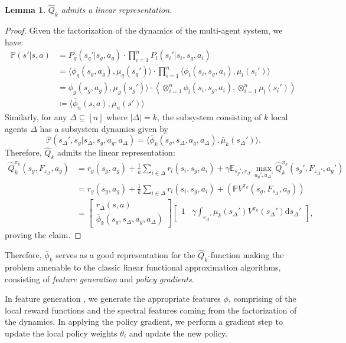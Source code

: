 \documentclass{article}
\theoremstyle{plain}
\newtheorem{lemma}[theorem]{Lemma}
\theoremstyle{definition}
\def\E{\mathbb{E}}
\begin{document}
\begin{lemma}
    \emph{$\hat{Q}_k$ admits a linear representation.}
\end{lemma}
\begin{proof}
Given the factorization of the dynamics of the multi-agent system, we have:
\begin{align*}\mathbb{P}(s'|s,a) &= P_g(s_g'|s_g,a_g)\cdot \prod_{i=1}^n P_l(s_i'|s_i,s_g,a_i) \\
&= \langle \phi_g(s_g,a_g), \mu_g(s_g')\rangle\cdot \prod_{i=1}^n \langle \phi_l(s_i,s_g,a_i), \mu_l(s_i')\rangle \\
&= \phi_g(s_g,a_g), \mu_g(s_g')\rangle\cdot \left\langle \otimes_{i=1}^n \phi_l(s_i,s_g,a_i), \otimes_{i=1}^n \mu_l(s_i')\right\rangle \\
&\coloneq \langle \bar{\phi}_n(s,a),\bar{\mu}_n(s')\rangle
\end{align*}
Similarly, for any $\Delta\subseteq [n]$ where $|\Delta|=k$, the subsystem consisting of $k$ local agents $\Delta$ has a subsystem dynamics given by \[\mathbb{P}(s_\Delta',s_g|s_\Delta,s_g,a_g,a_\Delta) = \langle \bar{\phi}_k(s_g,s_\Delta,a_g,a_\Delta),\bar{\mu}_k(s_\Delta')\rangle.\]
Therefore, $\hat{Q}_k$ admits the linear representation:
\begin{align*}\hat{Q}_k^{\pi_k}(s_g,F_{z_\Delta},a_g) &= r_g(s_g,a_g) + \frac{1}{k}\sum_{i\in\Delta}r_l(s_i,s_g,a_i) + \gamma\E_{s_g',s_{\Delta'}}\max_{a_g',a_{\Delta}'}\hat{Q}_k^{\pi_k}(s_g',F_{z_\Delta'},a_g')\\
&= r_g(s_g,a_g) + \frac{1}{k}\sum_{i\in\Delta}r_l(s_i,s_g,a_i) + (\mathbb{P} V^{\pi_k}(s_g,F_{s_\Delta},a_g))\\
&= \begin{bmatrix}r_\Delta(s,a)\\ \bar{\phi}_k(s_g,s_\Delta,a_g,a_\Delta)\end{bmatrix}\begin{bmatrix}1&\gamma\int_{s_\Delta'}\mu_k(s_\Delta')V^{\pi_k}(s_\Delta')\mathrm ds_{\Delta}'\end{bmatrix},
\end{align*}
proving the claim.
\end{proof}


Therefore, $\bar{\phi}_k$ serves as a good representation for the $\hat{Q}_k$-function making the problem amenable to the classic linear functional approximation algorithms, consisting of \emph{feature generation} and \emph{policy gradients}.

In feature generation \citep{ren2024scalablespectralrepresentationsnetwork}, we generate the appropriate features $\phi$, comprising of the local reward functions and the spectral features coming from the factorization of the dynamics. In applying the policy gradient, we perform a gradient step to update the local policy weights $\theta_i$ and update the new policy. 
\end{document}
